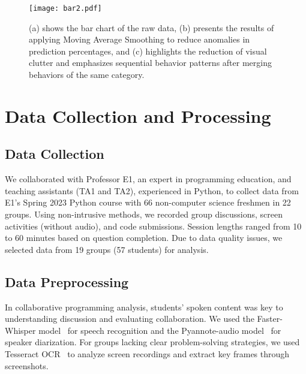 \begin{figure*}
    \centering
    \texttt{[image: bar2.pdf]}
    \caption{(a) shows the bar chart of the raw data, (b) presents the results of applying Moving Average Smoothing to reduce anomalies in prediction percentages, and (c) highlights the reduction of visual clutter and emphasizes sequential behavior patterns after merging behaviors of the same category.}
    \label{fig:bar}
\end{figure*}

\section{Data Collection and Processing}
\label{sec:data}

\subsection{Data Collection}
We collaborated with Professor E1, an expert in programming education, and teaching assistants (TA1 and TA2), experienced in Python, to collect data from E1's Spring 2023 Python course with 66 non-computer science freshmen in 22 groups. Using non-intrusive methods, we recorded group discussions, screen activities (without audio), and code submissions. Session lengths ranged from 10 to 60 minutes based on question completion. 
Due to data quality issues, we selected data from 19 groups (57 students) for analysis.


\subsection{Data Preprocessing}
In collaborative programming analysis, students' spoken content was key to understanding discussion and evaluating collaboration. We used the Faster-Whisper model~\cite{fasterwhisper} for speech recognition and the Pyannote-audio model~\cite{pyannoteaudio} for speaker diarization. 
For groups lacking clear problem-solving strategies, we used Tesseract OCR~\cite{tesseract} to analyze screen recordings and extract key frames through screenshots.

